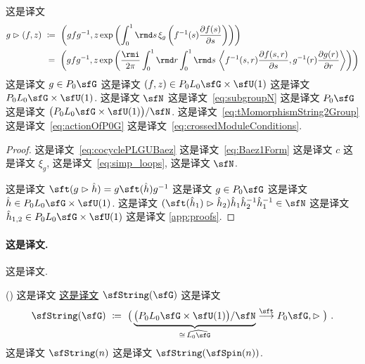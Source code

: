 \documentclass[
    affil-it, %
    auth-lg, %
    british, %
    compression, %
    contents, %
    custom-packages={}, %
    references={bigone}, %
]{lib/preprint}
\begin{document}
\begin{body}
        \begin{proposition}
            这是译文~\cite{Baez:2005sn}             \begin{equation}\label{eq:actionOfP0G}
                \begin{aligned}
                    g\acton(f,z)\ &\coloneqq\ \left(gfg^{-1},z\exp\left(\int_0^1\rmd s\,\xi_g\left(f^{-1}(s)\parder[f(s)]{s}\right)\right)\right)
                    \\
                    &\,=\ \left(gfg^{-1},z\exp\left(\frac{\rmi}{2\pi}\int_0^1\rmd r\int_0^1\rmd s\,\innerLarge{f^{-1}(s,r)\parder[f(s,r)]{s}}{g^{-1}(r)\parder[g(r)]{r}}\right)\right)
                \end{aligned}
            \end{equation}  这是译文 $g\in P_0\sfG$ 这是译文 $(f,z)\in P_0L_0\sfG\times\sfU(1)$ 这是译文 $P_0L_0\sfG\times\sfU(1)$. 这是译文 $\sfN$ 这是译文~\eqref{eq:subgroupN} 这是译文 $P_0\sfG$ 这是译文 $\big(P_0L_0\sfG\times\sfU(1)\big)/\sfN$. 这是译文~\eqref{eq:tMomorphismString2Group} 这是译文~\eqref{eq:actionOfP0G} 这是译文~\eqref{eq:crossedModuleConditions}.
        \end{proposition}

        \begin{proof}
            这是译文~\eqref{eq:cocyclePLGUBaez} 这是译文~\eqref{eq:Baez1Form} 这是译文 $c$ 这是译文 $\xi_g$, 这是译文~\eqref{eq:simp_loops}, 这是译文 $\sfN$. 

这是译文 $\sft(g\acton\hat h)=g\sft(\hat h)g^{-1}$ 这是译文 $g\in P_0\sfG$ 这是译文 $\hat h\in P_0L_0\sfG\times\sfU(1)$. 这是译文 $(\sft(\hat h_1)\acton\hat h_2)\hat h_1\hat h_2^{-1}\hat h_1^{-1}\in\sfN$ 这是译文 $\hat h_{1,2}\in P_0L_0\sfG\times\sfU(1)$ 这是译文 \cref{app:proofs}.
        \end{proof}

        \paragraph{这是译文.} 这是译文.

        \begin{definition} (\cite{Baez:2005sn})  这是译文 \uline{这是译文} $\sfString(\sfG)$ 这是译文             \begin{equation}\label{eq:string2GroupDefinition}
                \sfString(\sfG)\ \coloneqq\ \big(\underbrace{\big(P_0L_0\sfG\times\sfU(1)\big)/\sfN}_{\cong\,\widehat{L_0\sfG}}\overset{\sft}{\longrightarrow}P_0\sfG,\acton\big)~.
            \end{equation}  这是译文 $\sfString(n)$ 这是译文 $\sfString(\sfSpin(n))$.
        \end{definition}


\end{body}
\end{document}

